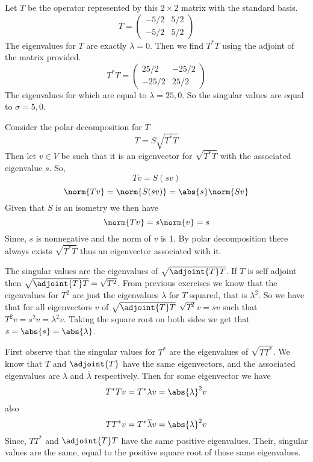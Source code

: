 \documentclass[10pt, twocolumn]{article}
\begin{document}
\begin{q}[2]
    Let $ T $ be the operator represented by this $ 2 \times 2 $ matrix with the standard basis.
    $$
    T =
        \left(
        \begin{array}{cc}
            -5/2  & 5/2 \\
            -5/2 & 5/2
        \end{array}
        \right)
    $$
    The eigenvalues for $ T $ are exactly $ \lambda = 0 $.
    Then we find $ T^* T $ using the adjoint of the matrix provided. 
    $$ 
    T^* T = 
        \left(
        \begin{array}{cc}
            25/2  & -25/2 \\
            -25/2 & 25/2
        \end{array}
        \right)
    $$
    The eigenvalues for which are equal to $ \lambda = 25, 0 $. 
    So the singular values are equal to $ \sigma = 5, 0 $.
\end{q}

\begin{q}[4]
    Consider the polar decomposition for $ T $  
    $$ T = S \sqrt{T^* T}$$
    Then let $ v \in V $ be such that it is an eigenvector for $ \sqrt{T^* T} $ with the associated eigenvalue $ s $.
    So, 
    $$ Tv = S(sv) $$
    $$ \norm{Tv} = \norm{S(sv)} = \abs{s}\norm{Sv} $$
    Given that $ S $ is an isometry we then have
    $$ \norm{Tv} = s \norm{v} = s $$
    Since, $ s $ is nonnegative and the norm of $ v $ is 1. 
    By polar decomposition there always exists $ \sqrt{T^* T} $ thus an eigenvector associated with it.
\end{q}

\begin{q}[10]
    The singular values are the eigenvalues of $ \sqrt{\adjoint{T}T} $. 
    If $ T $ is self adjoint then $ \sqrt{\adjoint{T}T} = \sqrt{T^2} $. 
    From previous exercises we know that the eigenvalues for $ T^2 $ are just the eigenvalues $ \lambda $ for $ T $ squared, that is $ \lambda^2 $. 
    So we have that for all eigenvectors $ v $ of $ \sqrt{\adjoint{T}T} $
    $ \sqrt{T^2}v = sv $ such that $ T^2v = s^2v = \lambda^2 v $. 
    Taking the square root on both sides we get that $ s = \abs{s} = \abs{\lambda} $.
\end{q}

\begin{q}[11]
    First observe that the singular values for $ T^* $ are the eigenvalues of 
    $ \sqrt{TT^*} $.
    We know that $ T $ and $ \adjoint{T} $ have the same eigenvectors,
    and the associated eigenvalues are $ \lambda $ and $ \overline{\lambda} $ respectively. 
    Then for some eigenvector we have 
    $$ T^*Tv = T^*\lambda v = \abs{\lambda}^2 v $$
    also
    $$ TT^*v = T^*\overline{\lambda} v = \abs{\lambda}^2 v $$
    Since, $ TT^* $ and $ \adjoint{T}T $ have the same positive eigenvalues. 
    Their, singular values are the same, equal to the positive square root of those same eigenvalues.
\end{q}
\end{document}
